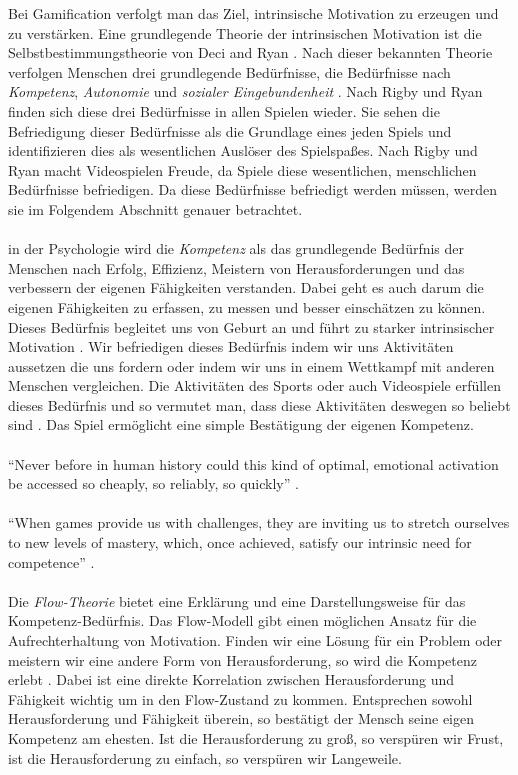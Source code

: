 \documentclass[a4paper,12pt]{scrartcl}
\begin{document}
Bei Gamification verfolgt man das Ziel, intrinsische Motivation zu erzeugen und zu verstärken. Eine grundlegende Theorie der intrinsischen Motivation ist die Selbstbestimmungstheorie von Deci and Ryan \cite{Ryan2000}. Nach dieser bekannten Theorie verfolgen Menschen drei grundlegende Bedürfnisse, die Bedürfnisse nach \textit{Kompetenz}, \textit{Autonomie} und \textit{sozialer Eingebundenheit} \cite{Rheinberg2006}. Nach Rigby und Ryan \cite{Rigby2011} finden sich diese drei Bedürfnisse in allen Spielen wieder. Sie sehen die Befriedigung dieser Bedürfnisse als die Grundlage eines jeden Spiels und identifizieren dies als wesentlichen Auslöser des Spielspaßes. Nach Rigby und Ryan \cite{Rigby2011} macht Videospielen Freude, da Spiele diese wesentlichen, menschlichen Bedürfnisse befriedigen. Da diese Bedürfnisse befriedigt werden müssen, werden sie im Folgendem Abschnitt genauer betrachtet.
\\\\
in der Psychologie wird die \textit{Kompetenz} als das grundlegende Bedürfnis der Menschen nach Erfolg, Effizienz, Meistern von Herausforderungen und das verbessern der eigenen Fähigkeiten verstanden. Dabei geht es auch darum die eigenen Fähigkeiten zu erfassen, zu messen und besser einschätzen zu können. Dieses Bedürfnis begleitet uns von Geburt an und führt zu starker intrinsischer Motivation \cite{Rigby2011}. Wir befriedigen dieses Bedürfnis indem wir uns Aktivitäten aussetzen die uns fordern oder indem wir uns in einem Wettkampf mit anderen Menschen vergleichen. Die Aktivitäten des Sports oder auch Videospiele erfüllen dieses Bedürfnis und so vermutet man, dass diese Aktivitäten deswegen so beliebt sind \cite{Mcgonigal2011}\cite{Rigby2011}\cite{Mayer2009}. Das Spiel ermöglicht eine simple Bestätigung der eigenen Kompetenz.
\\\\
\enquote{Never before in human history could this kind of optimal, emotional activation be accessed so cheaply, so reliably, so quickly} \cite{Mcgonigal2011}.
\\\\
\enquote{When games provide us with challenges, they are inviting us to stretch ourselves to new levels of mastery, which, once achieved, satisfy our intrinsic need for competence} \cite{Rigby2011}. 
\\\\
Die \textit{Flow-Theorie} bietet eine Erklärung und eine Darstellungsweise für das Kompetenz-Bedürfnis. Das Flow-Modell gibt einen möglichen Ansatz für die Aufrechterhaltung von Motivation. Finden wir eine Lösung für ein Problem oder meistern wir eine andere Form von Herausforderung, so wird die Kompetenz erlebt \cite{Csikszentmihalyi2017}. Dabei ist eine direkte Korrelation zwischen Herausforderung und Fähigkeit wichtig um in den Flow-Zustand zu kommen. Entsprechen sowohl Herausforderung und Fähigkeit überein, so bestätigt der Mensch seine eigen Kompetenz am ehesten. Ist die Herausforderung zu groß, so verspüren wir Frust, ist die Herausforderung zu einfach, so verspüren wir Langeweile.
\end{document}
